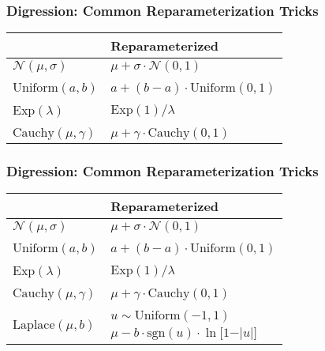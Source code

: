 \documentclass{beamer}
\begin{document}
\begin{frame}
  \frametitle{Digression: Common Reparameterization Tricks}
  \begin{center}
  \begin{tabular}{C{5cm}C{5cm}}
  \toprule
  {} & Reparameterized \\
  \midrule
  $\mathcal{N}(\mu, \sigma)$   &  $\mu + \sigma \cdot \mathcal{N}(0, 1)$ \\
  \\
  $\text{Uniform}(a, b)$   &  $a + (b - a) \cdot \text{Uniform}(0, 1)$ \\
  \\
  $\text{Exp}(\lambda)$   &  $\text{Exp}(1) / \lambda$ \\
  \\
  $\text{Cauchy}(\mu, \gamma)$   &  $\mu + \gamma \cdot \text{Cauchy}(0, 1)$ \\
  \bottomrule
  \end{tabular}
  \end{center}
\end{frame}

\begin{frame}
  \frametitle{Digression: Common Reparameterization Tricks}
  \begin{center}
  \begin{tabular}{C{5cm}C{5cm}}
  \toprule
  {} & Reparameterized \\
  \midrule
  $\mathcal{N}(\mu, \sigma)$   &  $\mu + \sigma \cdot \mathcal{N}(0, 1)$ \\
  \\
  $\text{Uniform}(a, b)$   &  $a + (b - a) \cdot \text{Uniform}(0, 1)$ \\
  \\
  $\text{Exp}(\lambda)$   &  $\text{Exp}(1) / \lambda$ \\
  \\
  $\text{Cauchy}(\mu, \gamma)$   &  $\mu + \gamma \cdot \text{Cauchy}(0, 1)$ \\
  \\
    &  $u \sim \text{Uniform}(-1, 1)$ \\
                                          & $\mu - b \cdot \text{sgn}(u) \cdot \ln \big[ 1 - \vert u \vert \big]$ \\
  \bottomrule
  \end{tabular}
  \end{center}
\end{frame}
\end{document}

